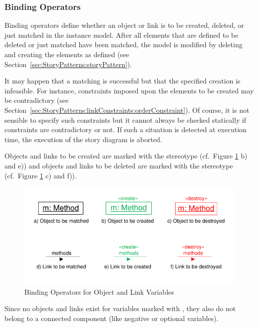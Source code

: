 \subsubsection{Binding Operators}
\label{sec:StoryPatterns:binding:operators}

Binding operators define whether an object or link is to be created, deleted,
or just matched in the instance model.
After all elements that are defined to be deleted or just matched have been
matched, the model is modified by deleting and creating the elements as
defined (see Section~\ref{sec:StoryPatterns:storyPattern}).

It may happen that a matching is successful but that the specified creation is infeasible.
For instance, constraints imposed upon the elements to be created may be contradictory (see Section~\ref{sec:StoryPatterns:linkConstraints:orderConstraint}).
Of course, it is not sensible to specify such constraints but it cannot always be checked statically if constraints are contradictory or not.
If such a situation is detected at execution time, the execution of the story diagram is aborted.

Objects and links to be created are marked with the
stereotype \create (cf.\ Figure \ref{fig:bindingOperatorsOverview} b) and e)) and objects and links
to be deleted are marked with the stereotype \destroy (cf.\ Figure
\ref{fig:bindingOperatorsOverview} c) and f)).

\begin{figure}[htb]
  \centering
  \includegraphics[scale=1.2]{figures/BindingOperatorsOverview}
  \caption{Binding Operators for Object and Link Variables}
  \label{fig:bindingOperatorsOverview}
\end{figure}

Since no objects and links exist for variables marked with \create, they also do not belong to a connected component (like
negative or optional variables).


